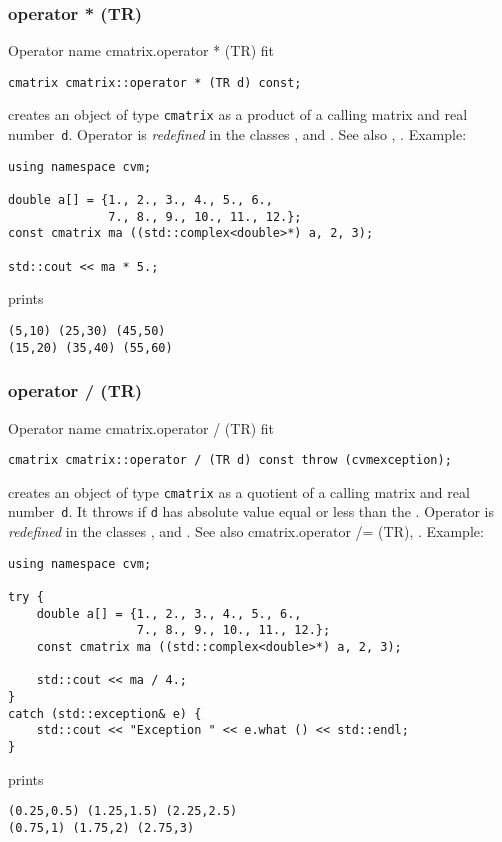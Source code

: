 \subsubsection{operator * (TR)}
Operator%
\pdfdest name {cmatrix.operator * (TR)} fit
\begin{verbatim}
cmatrix cmatrix::operator * (TR d) const;
\end{verbatim}
creates an object of type \verb"cmatrix" as a product of
a calling  matrix and  real number~\verb"d".
Operator is \emph{redefined} in the classes
,  
and .
See also 
,
.
Example:
\begin{Verbatim}
using namespace cvm;

double a[] = {1., 2., 3., 4., 5., 6.,
              7., 8., 9., 10., 11., 12.};
const cmatrix ma ((std::complex<double>*) a, 2, 3);

std::cout << ma * 5.;
\end{Verbatim}
prints
\begin{Verbatim}
(5,10) (25,30) (45,50)
(15,20) (35,40) (55,60)
\end{Verbatim}
\newpage



\subsubsection{operator / (TR)}
Operator%
\pdfdest name {cmatrix.operator / (TR)} fit
\begin{verbatim}
cmatrix cmatrix::operator / (TR d) const throw (cvmexception);
\end{verbatim}
creates an object of type \verb"cmatrix" as a quotient of
a calling  matrix and  real number~\verb"d". It throws
if \verb"d" has  absolute value equal or less than the
.
Operator is \emph{redefined} in the classes
,  
and .
See also 
{cmatrix.operator /= (TR)},
.
Example:
\begin{Verbatim}
using namespace cvm;

try {
    double a[] = {1., 2., 3., 4., 5., 6.,
                  7., 8., 9., 10., 11., 12.};
    const cmatrix ma ((std::complex<double>*) a, 2, 3);

    std::cout << ma / 4.;
}
catch (std::exception& e) {
    std::cout << "Exception " << e.what () << std::endl;
}
\end{Verbatim}
prints
\begin{Verbatim}
(0.25,0.5) (1.25,1.5) (2.25,2.5)
(0.75,1) (1.75,2) (2.75,3)
\end{Verbatim}
\newpage



